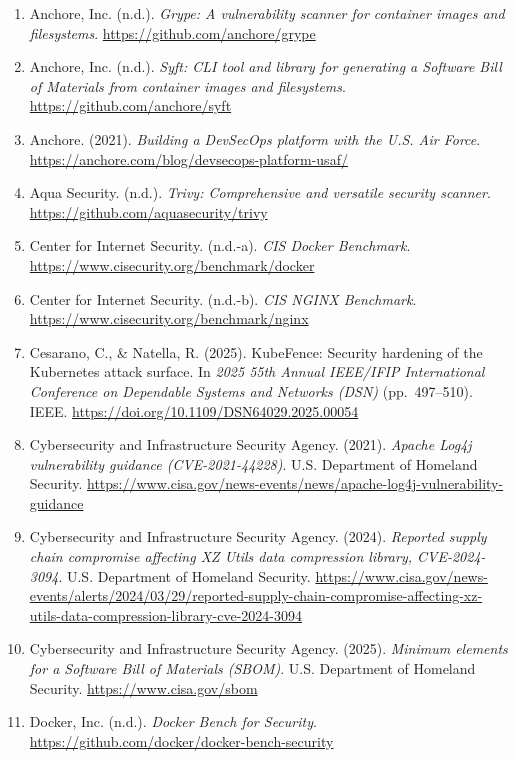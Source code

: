 \documentclass[10pt,letterpaper,twocolumn]{article}
\begin{document}
{\footnotesize
\begin{enumerate}[label=\arabic*.,leftmargin=*,itemsep=1pt,parsep=0pt,topsep=2pt]
\item Anchore, Inc. (n.d.). \textit{Grype: A vulnerability scanner for container images and filesystems}. \url{https://github.com/anchore/grype}
\item Anchore, Inc. (n.d.). \textit{Syft: CLI tool and library for generating a Software Bill of Materials from container images and filesystems}. \url{https://github.com/anchore/syft}
\item Anchore. (2021). \textit{Building a DevSecOps platform with the U.S. Air Force}. \url{https://anchore.com/blog/devsecops-platform-usaf/}
\item Aqua Security. (n.d.). \textit{Trivy: Comprehensive and versatile security scanner}. \url{https://github.com/aquasecurity/trivy}
\item Center for Internet Security. (n.d.-a). \textit{CIS Docker Benchmark}. \url{https://www.cisecurity.org/benchmark/docker}
\item Center for Internet Security. (n.d.-b). \textit{CIS NGINX Benchmark}. \url{https://www.cisecurity.org/benchmark/nginx}
\item Cesarano, C., \& Natella, R. (2025). KubeFence: Security hardening of the Kubernetes attack surface. In \textit{2025 55th Annual IEEE/IFIP International Conference on Dependable Systems and Networks (DSN)} (pp.~497--510). IEEE. \url{https://doi.org/10.1109/DSN64029.2025.00054}
\item Cybersecurity and Infrastructure Security Agency. (2021). \textit{Apache Log4j vulnerability guidance (CVE-2021-44228)}. U.S. Department of Homeland Security. \url{https://www.cisa.gov/news-events/news/apache-log4j-vulnerability-guidance}
\item Cybersecurity and Infrastructure Security Agency. (2024). \textit{Reported supply chain compromise affecting XZ Utils data compression library, CVE-2024-3094}. U.S. Department of Homeland Security. \url{https://www.cisa.gov/news-events/alerts/2024/03/29/reported-supply-chain-compromise-affecting-xz-utils-data-compression-library-cve-2024-3094}
\item Cybersecurity and Infrastructure Security Agency. (2025). \textit{Minimum elements for a Software Bill of Materials (SBOM)}. U.S. Department of Homeland Security. \url{https://www.cisa.gov/sbom}
\item Docker, Inc. (n.d.). \textit{Docker Bench for Security}. \url{https://github.com/docker/docker-bench-security}

\end{enumerate}}
\end{document}
